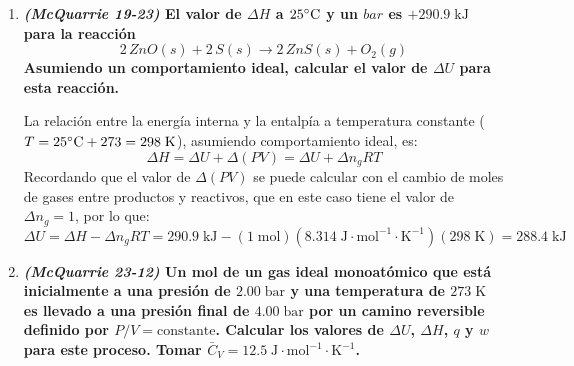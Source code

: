 \documentclass[a4paper,12pt]{article}
\begin{document}
\begin{enumerate}
Como es un proceso adiab\'atico $q=0$ y $dU=dw$; siendo un proceso reversible, podemos calcular el trabajo usando la presi\'on interna, dada por la ecuaci\'on del gas ideal, $P=nRT/V$, as\'i que:
$$dU=dw\;\rightarrow\;C_VdT=-\frac{nRT}{V}dV$$
$$\rightarrow\;\int_{T_1}^{T_2}\frac{\bar{C}_V}{RT}dT=-\int_{V_1}^{V_2}\frac{dV}{V}\;\rightarrow\;\frac{5}{2}\ln\frac{T_2}{T_1}=-\ln\frac{V_2}{V_1}$$
$$\rightarrow\;\ln\frac{T_2}{T_1}=\ln\left(\frac{V_1}{V_2}\right)^{2/5}\;\rightarrow\; T_2=T_1\left(\frac{V_1}{V_2}\right)^{2/5}$$
Por lo que:
$$T_2=(298\;\mbox{K})\left(\frac{20.0\;\mbox{dm}^3}{5.00\;\mbox{dm}^3}\right)^{2/5}=519\;\mbox{K}$$

 \item \textbf{\textit{(McQuarrie 19-23)} El valor de $\Delta H$ a $25\celsius$ y un $bar$ es $+290.9\;\mbox{kJ}$ para la reacci\'on
$$2\,ZnO(s)+2\,S(s)\rightarrow 2\,ZnS(s)+O_2(g)$$
Asumiendo un comportamiento ideal, calcular el valor de $\Delta U$ para esta reacci\'on.} %

La relaci\'on entre la energ\'ia interna y la entalp\'ia a temperatura constante ($T=25\celsius+273=298\;\mbox{K}$), asumiendo comportamiento ideal, es:
$$\Delta H=\Delta U+\Delta(PV)=\Delta U+\Delta n_{g}RT$$
Recordando que el valor de $\Delta(PV)$ se puede calcular con el cambio de moles de gases entre productos y reactivos, que en este caso tiene el valor de $\Delta n_{g}=1$, por lo que:
$$\Delta U=\Delta H-\Delta n_{g}RT=290.9\;\mbox{kJ}-(1\;\mbox{mol})(8.314\;\mbox{J}\cdot\mbox{mol}^{-1}\cdot\mbox{K}^{-1})(298\;\mbox{K})=288.4\;\mbox{kJ}$$

 \item \textbf{\textit{(McQuarrie 23-12)} Un mol de un gas ideal monoat\'omico que est\'a inicialmente a una presi\'on de $2.00\;\mbox{bar}$ y una temperatura de $273\;\mbox{K}$ es llevado a una presi\'on final de $4.00\;\mbox{bar}$ por un camino reversible definido por $P/V=\mbox{constante}$. Calcular los valores de $\Delta U$, $\Delta H$, $q$ y $w$ para este proceso. Tomar $\bar{C}_V=12.5\;\mbox{J}\cdot\mbox{mol}^{-1}\cdot\mbox{K}^{-1}$.} %


\end{enumerate}
\end{document}
